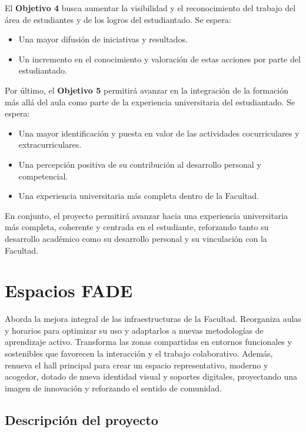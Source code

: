 \documentclass[11pt,a4paper]{scrreprt}
\begin{document}
El \textbf{Objetivo 4} busca aumentar la visibilidad y el reconocimiento del trabajo del área de estudiantes y de los logros del estudiantado. Se espera:
\begin{itemize}[noitemsep,topsep=2pt]
\item Una mayor difusión de iniciativas y resultados.
\item Un incremento en el conocimiento y valoración de estas acciones por parte del estudiantado.
\end{itemize}

Por último, el \textbf{Objetivo 5} permitirá avanzar en la integración de la formación más allá del aula como parte de la experiencia universitaria del estudiantado. Se espera:
\begin{itemize}[noitemsep,topsep=2pt]
\item Una mayor identificación y puesta en valor de las actividades cocurriculares y extracurriculares.
\item Una percepción positiva de su contribución al desarrollo personal y competencial.
\item Una experiencia universitaria más completa dentro de la Facultad.
\end{itemize}

En conjunto, el proyecto permitirá avanzar hacia una experiencia universitaria más completa, coherente y centrada en el estudiante, reforzando tanto su desarrollo académico como su desarrollo personal y su vinculación con la Facultad.

\chapter[Espacios FADE]{\textcolor{espcolor}{Espacios FADE}}
\begin{tcolorbox}[descbox]
\small Aborda la mejora integral de las infraestructuras de la Facultad. Reorganiza aulas y horarios para optimizar su uso y adaptarlos a nuevas metodologías de aprendizaje activo. Transforma las zonas compartidas en entornos funcionales y sostenibles que favorecen la interacción y el trabajo colaborativo. Además, renueva el hall principal para crear un espacio representativo, moderno y acogedor, dotado de nueva identidad visual y soportes digitales, proyectando una imagen de innovación y reforzando el sentido de comunidad.
\end{tcolorbox}

\section{Descripción del proyecto}
\end{document}
